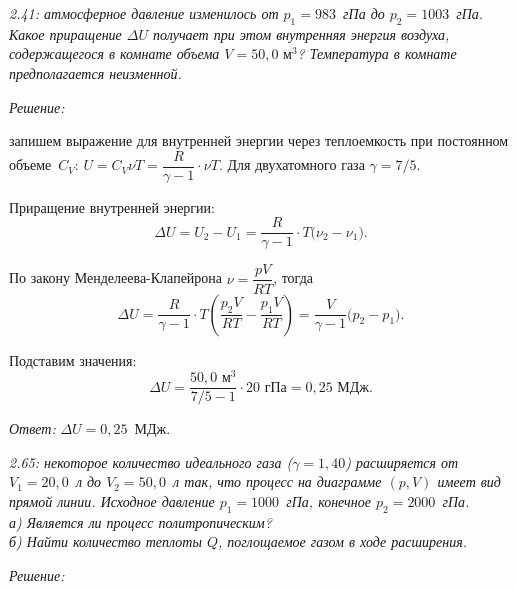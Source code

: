 \documentclass[pscyr]{hedsemwork}
\begin{document}
\maketitle


\emph{2.41: атмосферное давление изменилось от \( p_1 = 983 \)~гПа до
\( p_2 = 1003 \)~гПа. Какое приращение \( \Delta U \) получает при этом
внутренняя энергия воздуха, содержащегося в комнате объема
\( V = 50,\!0 \text{ м}^3\)? Температура в комнате предполагается неизменной.}

\vspace*{2em}
\emph{Решение:}

запишем выражение для внутренней энергии через теплоемкость при постоянном
объеме~\( C_V \): \( U = C_V \nu T = \dfrac{R}{\gamma - 1}\cdot\nu T \). Для
двухатомного газа \( \gamma = 7/5 \).

Приращение внутренней энергии:
\[
  \Delta U = U_2 - U_1 = \frac{R}{\gamma - 1}\cdot T\big( \nu_2 - \nu_1 \big).
\]

По закону Менделеева-Клапейрона \( \nu = \dfrac{pV}{RT} \), тогда
\[
  \Delta U = \frac{R}{\gamma - 1}\cdot T\left( \frac{p_2V}{RT} -
  \frac{p_1V}{RT} \right) = \frac{V}{\gamma - 1}\big( p_2 - p_1 \big).
\]

Подставим значения:
\[
  \Delta U = \frac{50,\!0 \text{ м}^3}{7/5 - 1}\cdot 20 \text{ гПа} =
  0,\!25 \text{ МДж}.
\]

\vspace*{2em}
\emph{Ответ:} \( \Delta U = 0,\!25\)~МДж.

\newpage %

\emph{2.65: некоторое количество идеального газа (\( \gamma = 1,\!40 \))
расширяется от \( V_1 = 20,\!0 \)~л до \( V_2 = 50,\!0 \)~л так, что процесс на
диаграмме \( (p, V) \) имеет вид прямой линии. Исходное давление
\( p_1 = 1000 \)~гПа, конечное \( p_2 = 2000 \)~гПа.\\
а) Является ли процесс политропическим?\\
б) Найти количество теплоты \( Q \), поглощаемое газом в ходе расширения.}

\vspace*{2em}
\emph{Решение:}
\end{document}
